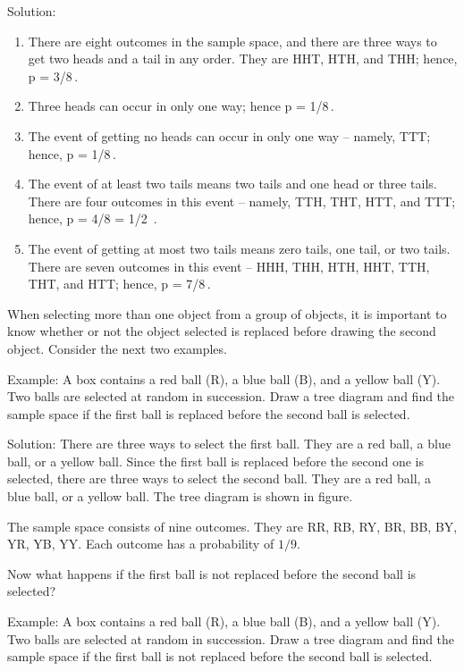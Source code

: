 Solution:
\begin{enumerate}
\item There are eight outcomes in the sample space, and there are three ways to get two heads and a tail in any order. They are HHT, HTH, and THH; hence,
\beq
p = 3/8\,.
\eeq
%
\item Three heads can occur in only one way; hence
\beq
p = 1/8\,.
\eeq
%
\item The event of getting no heads can occur in only one way -- namely, TTT; hence, 
\beq
p = 1/8\,.
\eeq
%
\item The event of at least two tails means two tails and one head or three tails. There are four outcomes in this event -- namely, TTH, THT, HTT, and TTT; hence,
\beq
p = 4/8 = 1/2 \,.
\eeq
%
\item The event of getting at most two tails means zero tails, one tail, or two tails. There are seven outcomes in this event -- HHH, THH, HTH, HHT, TTH, THT, and HTT; hence,
\beq
p = 7/8\,.
\eeq
\end{enumerate}

When selecting more than one object from a group of objects, it is important to know whether or not the object selected is replaced before drawing the second object. Consider the next two examples.

Example: A box contains a red ball (R), a blue ball (B), and a yellow ball (Y). Two balls are selected at random in succession. Draw a tree diagram and find the sample space if the first ball is replaced before the second ball is selected.

Solution: There are three ways to select the first ball. They are a red ball, a blue ball, or a yellow ball. Since the first ball is replaced before the second one is selected, there are three ways to select the second ball. They are a red ball, a blue ball, or a yellow ball. The tree diagram is shown in figure.

The sample space consists of nine outcomes. They are RR, RB, RY, BR, BB, BY, YR, YB, YY. Each outcome has a probability of $1/9$.

Now what happens if the first ball is not replaced before the second ball is selected?

Example: A box contains a red ball (R), a blue ball (B), and a yellow ball (Y). Two balls are selected at random in succession. Draw a tree diagram and find the sample space if the first ball is not replaced before the second ball is selected.

